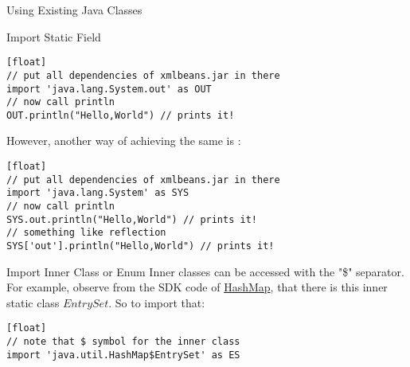 \begin{section}{Using Existing Java Classes}
\begin{subsection}{Import Static Field}
\begin{lstlisting}[style=JexlStyle][float]
// put all dependencies of xmlbeans.jar in there
import 'java.lang.System.out' as OUT
// now call println 
OUT.println("Hello,World") // prints it!
\end{lstlisting}

However, another way of achieving the same is :

\begin{lstlisting}[style=JexlStyle][float]
// put all dependencies of xmlbeans.jar in there
import 'java.lang.System' as SYS
// now call println 
SYS.out.println("Hello,World") // prints it!
// something like reflection
SYS['out'].println("Hello,World") // prints it!
\end{lstlisting}

\end{subsection}

\begin{subsection}{Import Inner Class or Enum}
Inner classes can be accessed with the "\$" separator.
For example, observe from the SDK code of 
\href{http://grepcode.com/file/repository.grepcode.com/java/root/jdk/openjdk/8u40-b25/java/util/HashMap.java/}{HashMap},
that there is this inner static class $EntrySet$. So to import that:

\begin{lstlisting}[style=JexlStyle][float]
// note that $ symbol for the inner class
import 'java.util.HashMap$EntrySet' as ES
\end{lstlisting}

\end{subsection}

\end{section}

